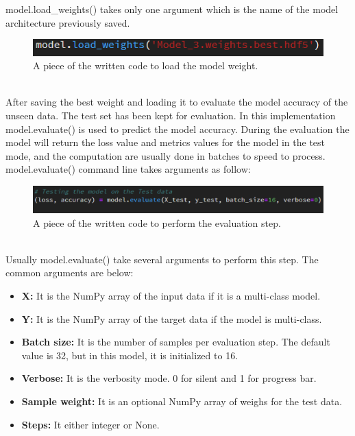 model.load\_weights() takes only one argument which is the name of the model architecture previously saved. 
\begin{figure}[ht]
    \centering
    \includegraphics{Figures/loadweight}
    \decoRule
    \caption [A piece of the written code to load the model weight.]{A piece of the written code to load the model weight.}
    \label{fig:la}
    \end{figure}\hfill \\
 After saving the best weight and loading it to evaluate the model accuracy of the unseen data. The test set has been kept for evaluation. 
In this implementation model.evaluate() is used to predict the model accuracy. During the evaluation the model will return the loss value and metrics values for the model in the test mode, and the computation are usually done in batches to speed to process.
model.evaluate() command line takes arguments as follow:
\begin{figure}[ht]
    \centering
    \includegraphics{Figures/ev}
    \decoRule
    \caption [A piece of the written code to perform the evaluation step.]{A piece of the written code to perform the evaluation step.}
    \label{fig:la}
    \end{figure}\hfill \\
    
Usually model.evaluate() take several arguments to perform this step. The common arguments are below:\\
 \noindent{}
 \begin{itemize}
     \item \textbf{X:} It is the NumPy array of the input data if it is a multi-class model.
     \item \textbf{Y:} It is the NumPy array of the target data if the model is multi-class.
     \item \textbf{Batch size:} It is the number of samples per evaluation step. The default value is 32, but in this model, it is initialized to 16.
     \item \textbf{Verbose:} It is the verbosity mode. 0 for silent and 1 for progress bar.
     \item \textbf{Sample weight:} It is an optional NumPy array of weighs for the test data.
     \item \textbf{Steps:} It either integer or None. 
     
 \end{itemize}
